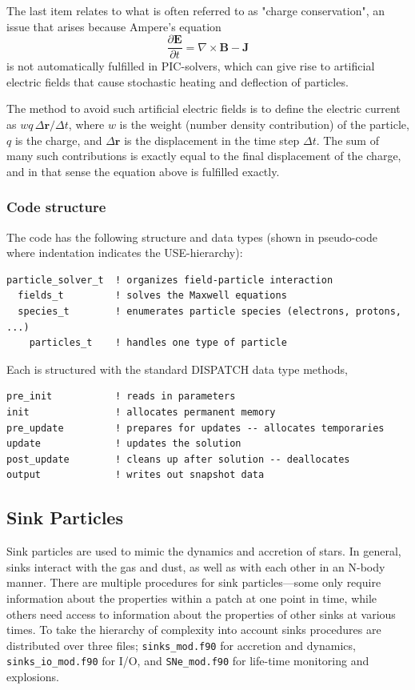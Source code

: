 \documentclass[paper=a4,fontsize=11pt]{scrartcl}
\numberwithin{equation}{section}		%
\numberwithin{figure}{section}			%
\numberwithin{table}{section}				%
\newcommand{\codecolor}{\color{Blue}}
\begin{document}
The last item relates to what is often referred to as "charge conservation", an issue that arises because Ampere's equation
\def\BB{\mathbf{B}}
\def\EE{\mathbf{E}}
\def\JJ{\mathbf{J}}
\def\rr{\mathbf{r}}
\begin{equation}
    \frac{\partial \EE}{\partial t} = \nabla\times \BB - \JJ
\end{equation}
is not automatically fulfilled in PIC-solvers, which can give rise to artificial electric fields that cause stochastic heating and deflection of particles.

The method to avoid such artificial electric fields is to define the electric current as $w q \, \Delta \rr/\Delta t$, where $w$ is the weight (number density contribution) of the particle, $q$ is the charge, and $\Delta \rr$ is the displacement in the time step $\Delta t$.   The sum of many such contributions is exactly equal to the final displacement of the charge, and in that sense the equation above is fulfilled exactly.

\subsubsection{Code structure}
The code has the following structure and data types (shown in pseudo-code where indentation indicates the USE-hierarchy):

{\codecolor \begin{verbatim}
particle_solver_t  ! organizes field-particle interaction
  fields_t         ! solves the Maxwell equations
  species_t        ! enumerates particle species (electrons, protons, ...)
    particles_t    ! handles one type of particle
\end{verbatim}}

Each is structured with the standard DISPATCH data type methods,
{\codecolor \begin{verbatim}
pre_init           ! reads in parameters
init               ! allocates permanent memory
pre_update         ! prepares for updates -- allocates temporaries
update             ! updates the solution
post_update        ! cleans up after solution -- deallocates
output             ! writes out snapshot data
\end{verbatim}}


\subsection{Sink Particles}
Sink particles are used to mimic the dynamics and accretion of stars. In general, sinks interact with the gas and dust, as well as with each other in an N-body manner.  There are multiple procedures for sink particles---some only require information about the properties within a patch at one point in time, while others need access to information about the properties of other sinks at various times. To take the hierarchy of complexity into account sinks procedures are distributed over three files; \verb|sinks_mod.f90| for accretion and dynamics, \verb|sinks_io_mod.f90| for I/O, and \verb|SNe_mod.f90| for life-time monitoring and explosions.
\end{document}
